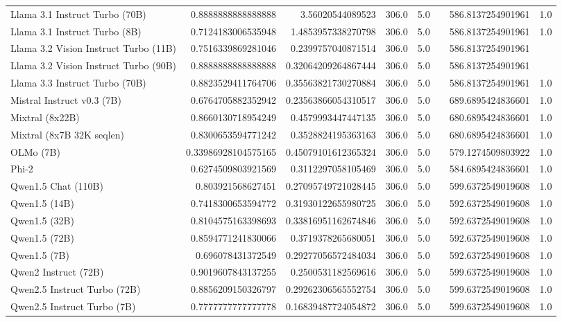 \begin{table}[htp]
{\begin{tabular}{lrrrrrrr}
Llama 3.1 Instruct Turbo (70B) & 0.8888888888888888 & 3.56020544089523 & 306.0 & 5.0 &  & 586.8137254901961 & 1.0 \\
Llama 3.1 Instruct Turbo (8B) & 0.7124183006535948 & 1.4853957338270798 & 306.0 & 5.0 &  & 586.8137254901961 & 1.0 \\
Llama 3.2 Vision Instruct Turbo (11B) & 0.7516339869281046 & 0.2399757040871514 & 306.0 & 5.0 &  & 586.8137254901961 &  \\
Llama 3.2 Vision Instruct Turbo (90B) & 0.8888888888888888 & 0.32064209264867444 & 306.0 & 5.0 &  & 586.8137254901961 &  \\
Llama 3.3 Instruct Turbo (70B) & 0.8823529411764706 & 0.35563821730270884 & 306.0 & 5.0 &  & 586.8137254901961 & 1.0 \\
Mistral Instruct v0.3 (7B) & 0.6764705882352942 & 0.23563866054310517 & 306.0 & 5.0 &  & 689.6895424836601 & 1.0 \\
Mixtral (8x22B) & 0.8660130718954249 & 0.4579993447447135 & 306.0 & 5.0 &  & 680.6895424836601 & 1.0 \\
Mixtral (8x7B 32K seqlen) & 0.8300653594771242 & 0.3528824195363163 & 306.0 & 5.0 &  & 680.6895424836601 & 1.0 \\
OLMo (7B) & 0.33986928104575165 & 0.45079101612365324 & 306.0 & 5.0 &  & 579.1274509803922 & 1.0 \\
Phi-2 & 0.6274509803921569 & 0.3112297058105469 & 306.0 & 5.0 &  & 584.6895424836601 & 1.0 \\
Qwen1.5 Chat (110B) & 0.803921568627451 & 0.27095749721028445 & 306.0 & 5.0 &  & 599.6372549019608 & 1.0 \\
Qwen1.5 (14B) & 0.7418300653594772 & 0.31930122655980725 & 306.0 & 5.0 &  & 592.6372549019608 & 1.0 \\
Qwen1.5 (32B) & 0.8104575163398693 & 0.33816951162674846 & 306.0 & 5.0 &  & 592.6372549019608 & 1.0 \\
Qwen1.5 (72B) & 0.8594771241830066 & 0.3719378265680051 & 306.0 & 5.0 &  & 592.6372549019608 & 1.0 \\
Qwen1.5 (7B) & 0.696078431372549 & 0.29277056572484034 & 306.0 & 5.0 &  & 592.6372549019608 & 1.0 \\
Qwen2 Instruct (72B) & 0.9019607843137255 & 0.2500531182569616 & 306.0 & 5.0 &  & 599.6372549019608 & 1.0 \\
Qwen2.5 Instruct Turbo (72B) & 0.8856209150326797 & 0.29262306565552754 & 306.0 & 5.0 &  & 599.6372549019608 & 1.0 \\
Qwen2.5 Instruct Turbo (7B) & 0.7777777777777778 & 0.16839487724054872 & 306.0 & 5.0 &  & 599.6372549019608 & 1.0 \\

\end{tabular}}
\end{table}
